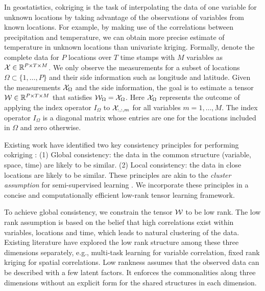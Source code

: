 In geostatistics, cokriging is the task of interpolating the data of one variable for unknown locations by taking advantage of the observations of variables from known locations. For example, by making use of the correlations between precipitation and temperature, we can obtain more precise estimate of temperature in unknown locations than univariate kriging. Formally, denote the complete data for $P$ locations over $T$ time stamps with $M$ variables as ${\mathcal X} \in \mathbb{R}^{P\times T\times M} $. We only observe the measurements for a subset of locations $\Omega \subset \{1, \ldots, P\}$ and their side information such as longitude and latitude. Given the measurements ${\mathcal X}_{\Omega}$ and the side information, the goal is to estimate a tensor ${\mathcal W} \in \mathbb{R}^{P\times T\times M}$ that satisfies ${\mathcal W}_\Omega =  {\mathcal X}_\Omega$. Here ${\mathcal X}_\Omega$ represents the outcome of applying the index operator $I_\Omega$ to ${\mathcal X}_{:, :, m}$ for all variables $ m= 1, \ldots, M$. The index operator $I_\Omega$ is a diagonal matrix whose entries are one for the locations included in $\Omega$ and zero otherwise.


Existing work have identified two key consistency principles for performing cokriging \cite[Chapter 6.2]{cressie2011statistics}: (1) Global consistency: the data in the common structure (variable, space, time) are likely to be similar. (2) Local consistency: the data in close locations are likely to be similar. These principles are akin to the \textit{cluster assumption} for semi-supervised learning \cite{zhou2003learning}. We incorporate these principles in a concise and computationally efficient low-rank tensor learning framework.

To achieve global consistency, we constrain the tensor ${\mathcal W}$ to be low rank. The low rank assumption is based on the belief that high correlations exist within variables, locations and time, which leads to natural clustering of the data. Existing literature have explored the low rank structure among these three dimensions separately, e.g., multi-task learning \cite{nie2010efficient} for variable correlation, fixed rank kriging \cite{cressie2008fixed} for spatial correlations. Low rankness assumes that the observed data can be described with a few latent factors. It enforces the commonalities along three dimensions without an explicit form for the shared structures in each dimension.

